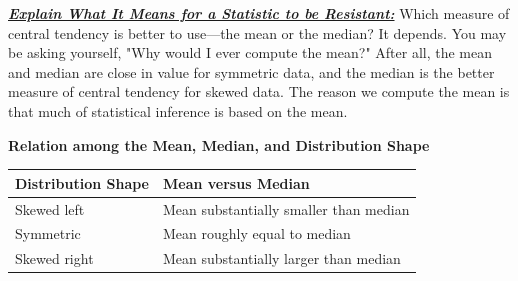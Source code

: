 \documentclass{report}
\begin{document}
         \bigbreak \noindent \bigbreak \noindent 
         \textbf{\textit{\underline{Explain What It Means for a Statistic to be Resistant:}}}
         \bigbreak \noindent 
         Which measure of central tendency is better to use—the mean or the median? It depends.
         \bigbreak \noindent 
         \bigbreak \noindent 
         You may be asking yourself, "Why would I ever compute the mean?" After all, the mean and median are close in value for symmetric data, and the median is the better measure of central tendency for skewed data. The reason we compute the mean is that much of statistical inference is based on the mean.
         \bigbreak \noindent \bigbreak \noindent \bigbreak \noindent \bigbreak \noindent \bigbreak \noindent \bigbreak \noindent \bigbreak \noindent \bigbreak \noindent \bigbreak \noindent \bigbreak \noindent \bigbreak \noindent \bigbreak \noindent \bigbreak \noindent \bigbreak \noindent \bigbreak \noindent \bigbreak \noindent \bigbreak \noindent \bigbreak \noindent 
         \begin{center}
             \textbf{Relation among the Mean, Median, and Distribution Shape}
         \end{center}
         \begin{center}
             \begin{tabular}{|l|l|}
                \hline
                \textbf{Distribution Shape} & \textbf{Mean versus Median} \\
                \hline
                Skewed left & Mean substantially smaller than median \\
                \hline
                Symmetric & Mean roughly equal to median \\
                \hline
                Skewed right & Mean substantially larger than median \\
                \hline
                \end{tabular}
         \end{center}
         \bigbreak \noindent 
\end{document}
